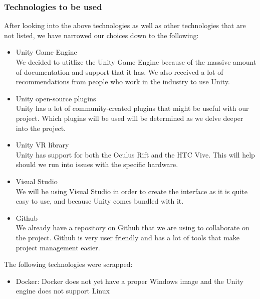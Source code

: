 \documentclass{article}
\begin{document}
	\subsubsection{Technologies to be used}
		After looking into the above technologies as well as other technologies that are not listed, we have narrowed our choices down to the following:
		\begin{itemize}
			\item Unity Game Engine \\
			We decided to utitlize the Unity Game Engine because of the massive amount of documentation and support that it has. We also received a lot of recommendations from people who work in the industry to use Unity.\\

			\item Unity open-source plugins \\
			Unity has a lot of community-created plugins that might be useful with our project. Which plugins will be used will be determined as we delve deeper into the project. \\

			\item Unity VR library \\
			Unity has support for both the Oculus Rift and the HTC Vive. This will help should we run into issues with the specific hardware. \\

			\item Visual Studio \\
			We will be using Visual Studio in order to create the interface as it is quite easy to use, and because Unity comes bundled with it. \\

			\item Github \\
			We already have a repository on Github that we are using to collaborate on the project. Github is very user friendly and has a lot of tools that make project management easier.
		\end{itemize}

	The following technologies were scrapped:
	\begin{itemize}
		\item Docker: Docker does not yet have a proper Windows image and the Unity engine does not support Linux
	\end{itemize}

\newpage
\end{document}
